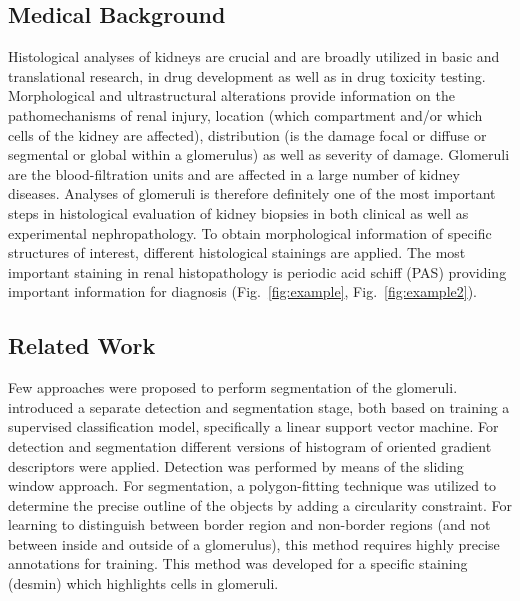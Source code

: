 \documentclass{elsarticle}
\begin{document}
\subsection{Medical Background}
Histological analyses of kidneys are crucial and are broadly utilized in basic and translational research, in drug development as well as in drug toxicity testing. 
Morphological and ultrastructural alterations provide information on the pathomechanisms of renal injury, location (which compartment and/or which cells of the kidney are affected), distribution (is the damage focal or diffuse or segmental or global within a glomerulus) as well as severity of damage. Glomeruli are the blood-filtration units and are affected in a large number of kidney diseases. Analyses of glomeruli is therefore definitely one of the most important steps in histological evaluation of kidney biopsies in both clinical as well as experimental nephropathology. To obtain morphological information of specific structures of interest, different histological stainings are applied. The most important staining in renal histopathology is periodic acid schiff (PAS) providing important information for diagnosis (Fig.~\ref{fig:example}, Fig.~\ref{fig:example2}).


\subsection{Related Work} \label{sec:related}

Few approaches were proposed to perform segmentation of the glomeruli.
\cite{myKato15a} introduced a separate detection and segmentation stage, both based on training a supervised classification model, specifically a linear support vector machine. For detection and segmentation different versions of histogram of oriented gradient descriptors were applied. Detection was performed by means of the sliding window approach. For segmentation, a polygon-fitting technique was utilized to determine the precise outline of the objects by adding a circularity constraint.
For learning to distinguish between border region and non-border regions (and not between inside and outside of a glomerulus), this method requires highly precise annotations for training. This method was developed for a specific staining (desmin) which highlights cells in glomeruli.
\end{document}

